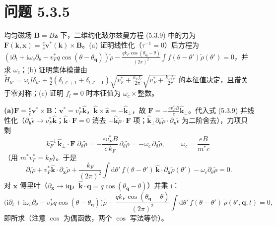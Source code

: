\section*{问题 5.3.5}
\begin{problem}
均匀磁场 $\pmb{B}=B\pmb{z}$ 下，二维约化玻尔兹曼方程 (5.3.9) 中的力为 $\pmb{F}(\pmb{k},\pmb{x})=\frac{e}{c}\pmb{v}^{*}(\pmb{k})\times\pmb{B}$。(a) 证明线性化（$\tau^{-1}=0$）后方程为 $(\mathrm{i}\partial_t+\mathrm{i}\omega_c\partial_\theta-v_F^{*}q\cos(\theta-\theta_{\pmb q}))\tilde\rho-\frac{qk_F\cos(\theta_{\pmb q}-\theta)}{(2\pi)^{2}}\int f(\theta-\theta')\tilde\rho(\theta')=0$，并求 $\omega_c$；(b) 证明集体模谱由 $\tilde H_{ll'}=\omega_cl\delta_{ll'}+\frac{q}{2}(\delta_{l,l'+1}+\delta_{l,l'-1})\sqrt{v_F^{*}+\frac{k_Ff_l}{2\pi}}\sqrt{v_F^{*}+\frac{k_Ff_{l'}}{2\pi}}$ 的本征值决定，且谱关于零对称；(c) 证明 $f_l=0$ 时本征值为 $\omega_c\times$整数。
\end{problem}
\solution

\textbf{(a)}$\pmb{F}=\frac{e}{c}\pmb{v}^{*}\times\pmb{B}$：$\pmb{v}^{*}=v_F^{*}\hat{\pmb{k}}$，$\hat{\pmb{k}}\times\hat{\pmb{z}}=-\hat{\pmb{k}}_{\perp}$，故 $\pmb{F}=-\frac{ev_F^{*}B}{c}\hat{\pmb{k}}_{\perp}$。代入式 (5.3.9) 并线性化（$\partial_{\pmb{k}}\tilde\epsilon\to v_F^{*}\hat{\pmb{k}}$；$\hat{\pmb{k}}\cdot\pmb{F}=0$ 消去 $-\hat{\pmb{k}}\tilde\rho\cdot\pmb{F}$ 项；$\hat{\pmb{k}}_{\perp}\partial_\theta\tilde\rho\cdot\partial_{\pmb{x}}\tilde\epsilon$ 为二阶舍去），力项只剩
\begin{equation*}
k_F^{-1}\,\hat{\pmb{k}}_{\perp}\!\cdot\!\pmb{F}\;\partial_\theta\tilde\rho
=-\frac{ev_F^{*}B}{c\,k_F}\,\partial_\theta\tilde\rho
=-\omega_c\,\partial_\theta\tilde\rho,
\qquad
\boxed{\;\omega_c=\frac{eB}{m^{*}c}\;}
\end{equation*}
（用 $m^{*}v_F^{*}=k_F$）。于是
\begin{equation*}
\partial_t\tilde\rho+v_F^{*}\hat{\pmb{k}}\cdot\partial_{\pmb{x}}\tilde\rho
+\frac{k_F}{(2\pi)^{2}}\int\mathrm{d}\theta'\,f(\theta-\theta')\,\hat{\pmb{k}}\cdot\partial_{\pmb{x}}\tilde\rho(\theta')
-\omega_c\partial_\theta\tilde\rho=0 .
\end{equation*}
对 $\pmb{x}$ 傅里叶（$\partial_{\pmb{x}}\to\mathrm{i}\pmb{q}$，$\hat{\pmb{k}}\cdot\pmb{q}=q\cos(\theta_{\pmb{q}}-\theta)$）并乘 $\mathrm{i}$：
\begin{equation*}
\Big(\mathrm{i}\partial_t+\mathrm{i}\omega_c\partial_\theta-v_F^{*}q\cos(\theta-\theta_{\pmb{q}})\Big)\tilde\rho
-\frac{qk_F\cos(\theta_{\pmb{q}}-\theta)}{(2\pi)^{2}}\int\mathrm{d}\theta'\,f(\theta-\theta')\,\tilde\rho(\theta',\pmb{q},t)=0 ,
\end{equation*}
即所求（注意 $\cos$ 为偶函数，两个 $\cos$ 写法等价）。

